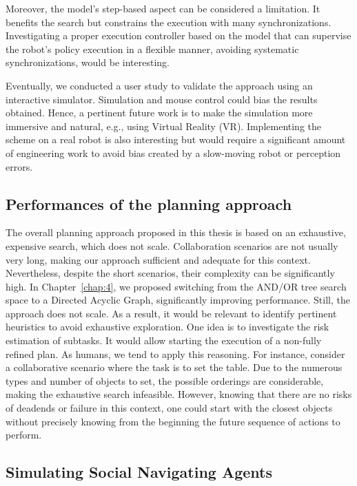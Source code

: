 Moreover, the model's step-based aspect can be considered a limitation. It benefits the search but constrains the execution with many synchronizations. Investigating a proper execution controller based on the model that can supervise the robot's policy execution in a flexible manner, avoiding systematic synchronizations, would be interesting.

Eventually, we conducted a user study to validate the approach using an interactive simulator. Simulation and mouse control could bias the results obtained. Hence, a pertinent future work is to make the simulation more immersive and natural, e.g., using Virtual Reality (VR). Implementing the scheme on a real robot is also interesting but would require a significant amount of engineering work to avoid bias created by a slow-moving robot or perception errors. 

\subsection*{Performances of the planning approach}

The overall planning approach proposed in this thesis is based on an exhaustive, expensive search, which does not scale. Collaboration scenarios are not usually very long, making our approach sufficient and adequate for this context. Nevertheless, despite the short scenarios, their complexity can be significantly high. In Chapter~\ref{chap:4}, we proposed switching from the AND/OR tree search space to a Directed Acyclic Graph, significantly improving performance. Still, the approach does not scale. As a result, it would be relevant to identify pertinent heuristics to avoid exhaustive exploration. One idea is to investigate the risk estimation of subtasks. It would allow starting the execution of a non-fully refined plan. As humans, we tend to apply this reasoning. For instance, consider a collaborative scenario where the task is to set the table. Due to the numerous types and number of objects to set, the possible orderings are considerable, making the exhaustive search infeasible. However, knowing that there are no risks of deadends or failure in this context, one could start with the closest objects without precisely knowing from the beginning the future sequence of actions to perform.  

\subsection*{Simulating Social Navigating Agents}

